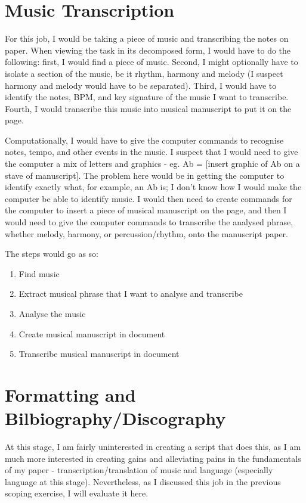 \documentclass{article}
\begin{document}
\section{Music Transcription}
For this job, I would be taking a piece of music and transcribing the notes on paper. When viewing the task in its decomposed form, I would have to do the following: first, I would find a piece of music. Second, I might optionally have to isolate a section of the music, be it rhythm, harmony and melody (I suspect harmony and melody would have to be separated). Third, I would have to identify the notes, BPM, and key signature of the music I want to transcribe. Fourth, I would transcribe this music into musical manuscript to put it on the page.

Computationally, I would have to give the computer commands to recognise notes, tempo, and other events in the music. I suspect that I would need to give the computer a mix of letters and graphics -  eg. Ab = [insert graphic of Ab on a stave of manuscript]. The problem here would be in getting the computer to identify exactly what, for example, an Ab is; I don't know how I would make the computer be able to identify music. I would then need to create commands for the computer to insert a piece of musical manuscript on the page, and then I would need to give the computer commands to transcribe the analysed phrase, whether melody, harmony, or percussion/rhythm, onto the manuscript paper.

The steps would go as so:
\begin{enumerate}
\item Find music
\item Extract musical phrase that I want to analyse and transcribe
\item Analyse the music
\item Create musical manuscript in document
\item Transcribe musical manuscript in document
\end{enumerate}
\section{Formatting and Bilbiography/Discography}
At this stage, I am fairly uninterested in creating a script that does this, as I am much more interested in creating gains and alleviating pains in the fundamentals of my paper - transcription/translation of music and language (especially language at this stage). Nevertheless, as I discussed this job in the previous scoping exercise, I will evaluate it here.
\end{document}
